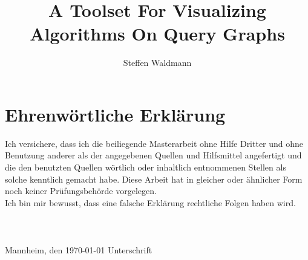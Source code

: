 \documentclass[a4paper,12pt,titlepage,twoside]{article}
\title{A Toolset For Visualizing Algorithms On Query Graphs}
\author{Steffen Waldmann}
\theoremstyle{definition}
\numberwithin{equation}{section}
\newcommand{\clearemptydoublepage}{\newpage{\pagestyle{empty}\cleardoublepage}}
\begin{document}
\maketitle
\clearemptydoublepage

\tableofcontents
\clearpage
\listofalgorithms
\listoffigures
\listoftables





%





\newpage

\thispagestyle{empty}

\section*{Ehrenwörtliche Erklärung}
Ich versichere, dass ich die beiliegende Masterarbeit ohne Hilfe Dritter
und ohne Benutzung anderer als der angegebenen Quellen und Hilfsmittel 
angefertigt und die den benutzten Quellen wörtlich oder inhaltlich 
entnommenen Stellen als solche kenntlich gemacht habe. Diese Arbeit 
hat in gleicher oder ähnlicher Form noch keiner Prüfungsbehörde 
vorgelegen.\\
Ich bin mir bewusst, dass eine falsche Erklärung rechtliche Folgen haben
wird.\\ \\ \\ \\
\vspace{2cm}
Mannheim, den \today \hspace{4cm} Unterschrift  \\
\end{document}
